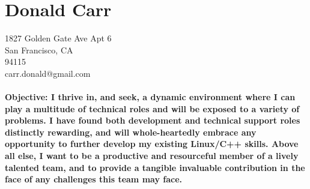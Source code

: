 \documentclass{article}
\begin{document}

\centering
\section*{Donald Carr}
1827 Golden Gate Ave Apt 6\\
San Francisco, CA \\
94115 \\
carr.donald@gmail.com \\
\hspace*{\fill} \\

\bf{Objective:}
I thrive in, and seek, a dynamic environment where I can play a multitude of technical roles and will be exposed to a variety of problems. I have found both development and technical support roles distinctly rewarding, and will whole-heartedly embrace any opportunity to further develop my existing Linux/C++ skills. Above all else, I want to be a productive and resourceful member of a lively talented team, and to provide a tangible invaluable contribution in the face of any challenges this team may face.
\end{document}
